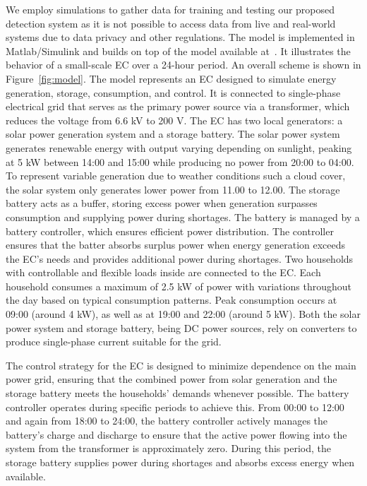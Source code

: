 We employ simulations to gather data for training and testing our proposed detection system as it is not possible to access data from live and real-world systems due to data privacy and other regulations. The model is implemented in Matlab/Simulink  and builds on top of the model available at~\cite{ec-model}. It illustrates the behavior of a small-scale EC over a 24-hour period. An overall scheme is shown in Figure~\ref{fig:model}. The model represents an EC designed to simulate energy generation, storage, consumption, and control. It is connected to single-phase electrical grid that serves as the primary power source via a transformer, which reduces the voltage from 6.6 kV to 200 V. The EC has two local generators: a solar power generation system and a storage battery. The solar power system generates renewable energy with output varying depending on sunlight, peaking at 5 kW between 14:00 and 15:00 while producing no power from 20:00 to 04:00. To represent variable generation due to weather conditions such a cloud cover, the solar system only generates lower power from 11.00 to 12.00. The storage battery acts as a buffer, storing excess power when generation surpasses consumption and supplying power during shortages. The battery is managed by a battery controller, which ensures efficient power distribution. The controller ensures that the batter absorbs surplus power when energy generation exceeds the EC's needs and provides additional power during shortages. Two households with controllable and flexible loads inside are connected to the EC. Each household consumes a maximum of 2.5 kW of power with variations throughout the day based on typical consumption patterns. Peak consumption occurs at 09:00 (around 4 kW), as well as at 19:00 and 22:00 (around 5 kW). Both the solar power system and storage battery, being DC power sources, rely on converters to produce single-phase current suitable for the grid.



The control strategy for the EC is designed to minimize dependence on the main power grid, ensuring that the combined power from solar generation and the storage battery meets the households' demands whenever possible. The battery controller operates during specific periods to achieve this. From 00:00 to 12:00 and again from 18:00 to 24:00, the battery controller actively manages the battery's charge and discharge to ensure that the active power flowing into the system from the transformer is approximately zero. During this period, the storage battery supplies power during shortages and absorbs excess energy when available.

